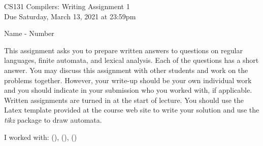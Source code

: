 \documentclass[10pt]{article}
\begin{document}
\begin{center}
\Large CS131 Compilers: Writing Assignment 1\\Due Saturday, March 13, 2021 at 23:59pm
\end{center}

\begin{center}
\LARGE Name - Number
\end{center}


This assignment asks you to prepare written answers to questions on
regular languages, finite automata, and lexical analysis.  Each of the
questions has a short answer.  You may discuss this assignment with
other students and work on the problems together.  However, your
write-up should be your own individual work and you should indicate in your submission who you worked
with, if applicable.  Written assignments are turned in at the start of lecture.
You should use the Latex template provided at the course web site to write your solution and use the \emph{tikz} package to draw
automata.

\begin{center}
I worked with: (), (), ()
\end{center}
\end{document}
